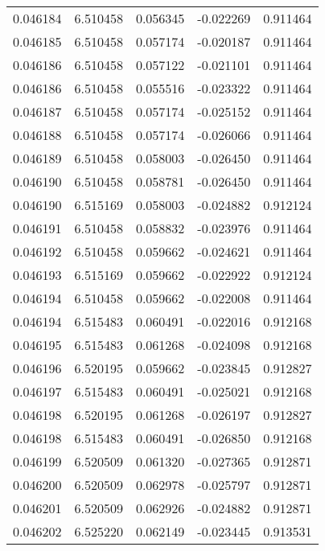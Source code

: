\begin{tabular}{lrrrr}
0.046184    &  6.510458 &  0.056345 & -0.022269 &             0.911464 \\
0.046185    &  6.510458 &  0.057174 & -0.020187 &             0.911464 \\
0.046186    &  6.510458 &  0.057122 & -0.021101 &             0.911464 \\
0.046186    &  6.510458 &  0.055516 & -0.023322 &             0.911464 \\
0.046187    &  6.510458 &  0.057174 & -0.025152 &             0.911464 \\
0.046188    &  6.510458 &  0.057174 & -0.026066 &             0.911464 \\
0.046189    &  6.510458 &  0.058003 & -0.026450 &             0.911464 \\
0.046190    &  6.510458 &  0.058781 & -0.026450 &             0.911464 \\
0.046190    &  6.515169 &  0.058003 & -0.024882 &             0.912124 \\
0.046191    &  6.510458 &  0.058832 & -0.023976 &             0.911464 \\
0.046192    &  6.510458 &  0.059662 & -0.024621 &             0.911464 \\
0.046193    &  6.515169 &  0.059662 & -0.022922 &             0.912124 \\
0.046194    &  6.510458 &  0.059662 & -0.022008 &             0.911464 \\
0.046194    &  6.515483 &  0.060491 & -0.022016 &             0.912168 \\
0.046195    &  6.515483 &  0.061268 & -0.024098 &             0.912168 \\
0.046196    &  6.520195 &  0.059662 & -0.023845 &             0.912827 \\
0.046197    &  6.515483 &  0.060491 & -0.025021 &             0.912168 \\
0.046198    &  6.520195 &  0.061268 & -0.026197 &             0.912827 \\
0.046198    &  6.515483 &  0.060491 & -0.026850 &             0.912168 \\
0.046199    &  6.520509 &  0.061320 & -0.027365 &             0.912871 \\
0.046200    &  6.520509 &  0.062978 & -0.025797 &             0.912871 \\
0.046201    &  6.520509 &  0.062926 & -0.024882 &             0.912871 \\
0.046202    &  6.525220 &  0.062149 & -0.023445 &             0.913531 \\

\end{tabular}
